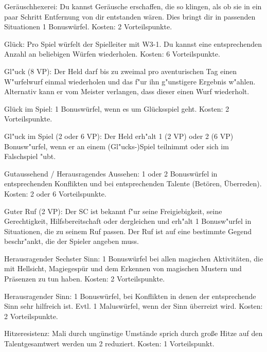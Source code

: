\begin{description}
\item{Geräuschhexerei:} Du kannst Geräusche erschaffen, die so klingen, als ob sie in ein paar Schritt Entfernung von dir entstanden wären. Dies bringt dir in passenden Situationen 1 Bonuswürfel. Kosten: 2 Vorteilspunkte.

\item{Glück:} Pro Spiel würfelt der Spielleiter mit W3-1. Du kannst eine entsprechenden Anzahl an beliebigen Würfen wiederholen. Kosten: 6 Vorteilspunkte.

\item{Gl"uck (8 VP):} Der Held darf bis zu zweimal pro aventurischen Tag einen W"urfelwurf einmal wiederholen und das f"ur ihn g"unstigere Ergebnis w"ahlen. Alternativ kann er vom Meister verlangen, dass dieser einen Wurf wiederholt.

\item{Glück im Spiel:} 1 Bonuswürfel, wenn es um Glücksspiel geht. Kosten: 2 Vorteilspunkte.

\item{Gl"uck im Spiel (2 oder 6 VP):} Der Held erh"alt 1 (2 VP) oder 2 (6 VP) Bonusw"urfel, wenn er an einem (Gl"ucks-)Spiel teilnimmt oder sich im Falschspiel "ubt.

\item{Gutaussehend / Herausragendes Aussehen:} 1 oder 2 Bonuswürfel in entsprechenden Konflikten und bei entsprechenden Talente (Betören, Überreden). Kosten: 2 oder 6 Vorteilspunkte.

\item{Guter Ruf (2 VP):}
Der SC ist bekannt f"ur seine Freigiebigkeit, seine Gerechtigkeit, Hilfsbereitschaft oder dergleichen und erh"alt 1 Bonusw"urfel in Situationen, die zu seinem Ruf passen. Der Ruf ist auf eine bestimmte Gegend beschr"ankt, die der Spieler angeben muss.

\item{Herausragender Sechster Sinn:} 1 Bonuswürfel bei allen magischen Aktivitäten, die mit Hellsicht, Magiegespür und dem Erkennen von magischen Mustern und Präsenzen zu tun haben. Kosten: 2 Vorteilspunkte.

\item{Herausragender Sinn:} 1 Bonuswürfel, bei Konflikten in denen der entsprechende Sinn sehr hilfreich ist. Evtl. 1 Maluswürfel, wenn der Sinn überreizt wird. Kosten: 2 Vorteilspunkte.

\item{Hitzeresistenz:} Mali durch ungünstige Umstände sprich durch große Hitze auf den Talentgesamtwert werden um 2 reduziert. Kosten: 1 Vorteilspunkt.


\end{description}
